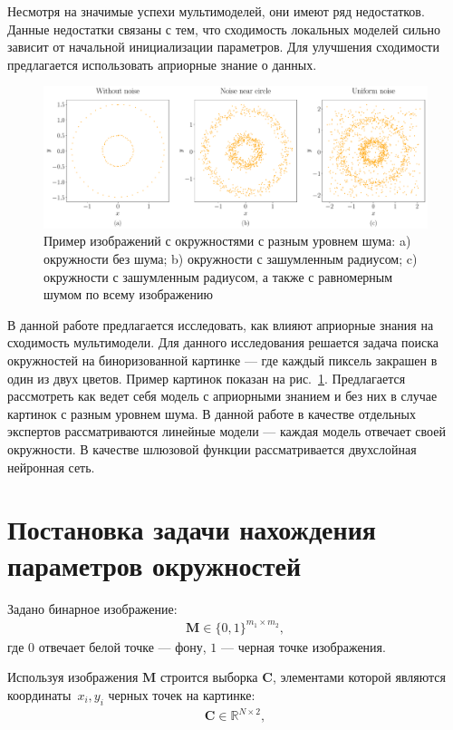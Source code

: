 \documentclass[12pt, twoside]{article}
\numberwithin{equation}{section}
\begin{document}
Несмотря на значимые успехи мультимоделей, они имеют ряд недостатков. Данные недостатки связаны с тем, что сходимость локальных моделей сильно зависит от начальной инициализации параметров. Для улучшения сходимости предлагается использовать априорные знание о данных.

\begin{figure}[h!t]\center
\includegraphics[width=1\textwidth]{results/statment}
\caption{Пример изображений с окружностями с разным уровнем шума: a) окружности без шума; b) окружности с зашумленным радиусом; c) окружности с зашумленным радиусом, а также с равномерным шумом по всему изображению}
\label{example:1}
\end{figure}

В данной работе предлагается исследовать, как влияют априорные знания на сходимость мультимодели. Для данного исследования решается задача поиска окружностей на биноризованной  картинке --- где каждый пиксель закрашен в один из двух цветов. Пример картинок показан на рис.~\ref{example:1}. Предлагается рассмотреть как ведет себя модель с априорными знанием и без них в случае картинок с разным уровнем шума. В данной работе в качестве отдельных экспертов рассматриваются линейные модели --- каждая модель отвечает своей окружности. В качестве шлюзовой функции рассматривается двухслойная нейронная сеть.



\section{Постановка задачи нахождения параметров окружностей}
Задано бинарное изображение:
\begin{equation}
\label{eq:st:cr:1}
\begin{aligned}
\textbf{M} \in \{0,1\}^{m_1 \times m_2},
\end{aligned}
\end{equation}
где $0$ отвечает белой точке --- фону, $1$ --- черная точке изображения.

Используя изображения $\textbf{M}$ строится выборка $\textbf{C}$, элементами которой являются координаты~$x_i, y_i$ черных точек на картинке:
\begin{equation}
\label{eq:st:cr:2}
\begin{aligned}
\textbf{C} \in  \mathbb{R}^{N \times 2},
\end{aligned}
\end{equation}
\end{document}
